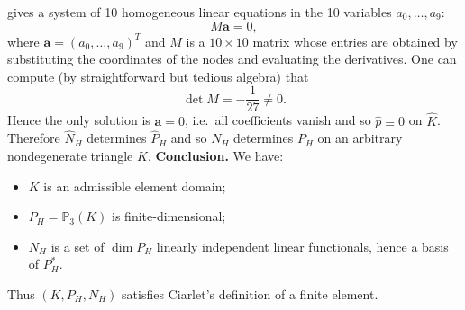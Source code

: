 gives a system of 10 homogeneous linear equations in the 10 variables $a_0,\dots,a_9$:
\[
    M \mathbf{a} = 0,
\]
where $\mathbf{a} = (a_0,\dots,a_9)^T$ and $M$ is a $10\times 10$ matrix whose entries are
obtained by substituting the coordinates of the nodes and evaluating the derivatives.
One can compute (by straightforward but tedious algebra) that
\[
    \det M = -\frac{1}{27} \neq 0.
\]
Hence the only solution is $\mathbf{a} = 0$, i.e.\ all coefficients vanish and so
$\hat p \equiv 0$ on $\widehat K$.
Therefore $\widehat N_H$ determines $\widehat P_H$ and so $N_H$ determines $P_H$
on an arbitrary nondegenerate triangle $K$.
\textbf{Conclusion.}
We have:
\begin{itemize}
    \item $K$ is an admissible element domain;
    \item $P_H=\mathbb{P}_3(K)$ is finite-dimensional;
    \item $N_H$ is a set of $\dim P_H$ linearly independent linear functionals,
          hence a basis of $P_H^\ast$.
\end{itemize}
Thus $(K,P_H,N_H)$ satisfies Ciarlet's definition of a finite element.
